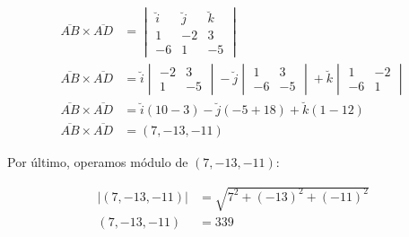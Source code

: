 \documentclass{article}
\begin{document}
\begin{align*}
    \overline{AB} \times \overline{AD} & = \begin{vmatrix}
        \breve{i} & \breve{j} & \breve{k} \\
        1 & -2 & 3 \\
        -6 & 1 & -5
    \end{vmatrix}\\
    \overline{AB} \times \overline{AD} & = \breve{i}  \begin{vmatrix}
        -2 & 3\\
        1 & -5
    \end{vmatrix} - \breve{j} \begin{vmatrix}
        1 & 3\\
        -6 & -5
    \end{vmatrix} + \breve{k}  \begin{vmatrix}
        1 & -2\\
        -6 & 1
    \end{vmatrix}\\
    \overline{AB} \times \overline{AD} & = \breve{i}(10 - 3) -
    \breve{j}(-5 +18) + \breve{k}(1-12)\\
    \overline{AB} \times \overline{AD} & = (7, -13, -11)
\end{align*}

Por último, operamos módulo de $(7, -13, -11)$:


\begin{align*}
    |(7, -13, -11)| & = \sqrt{7^2 + (-13)^2 + (-11)^2}\\
    (7, -13, -11) &= \boxed{339}
\end{align*}
\end{document}
